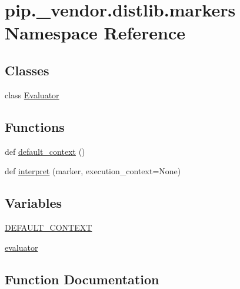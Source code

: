 \hypertarget{namespacepip_1_1__vendor_1_1distlib_1_1markers}{}\section{pip.\+\_\+vendor.\+distlib.\+markers Namespace Reference}
\label{namespacepip_1_1__vendor_1_1distlib_1_1markers}
\subsection*{Classes}
\begin{DoxyCompactItemize}
\item 
class \hyperlink{classpip_1_1__vendor_1_1distlib_1_1markers_1_1Evaluator}{Evaluator}
\end{DoxyCompactItemize}
\subsection*{Functions}
\begin{DoxyCompactItemize}
\item 
def \hyperlink{namespacepip_1_1__vendor_1_1distlib_1_1markers_aff0d15d93b0091980553a9812f6cc44b}{default\+\_\+context} ()
\item 
def \hyperlink{namespacepip_1_1__vendor_1_1distlib_1_1markers_a9799f8442440235d4c12b42de912ce64}{interpret} (marker, execution\+\_\+context=None)
\end{DoxyCompactItemize}
\subsection*{Variables}
\begin{DoxyCompactItemize}
\item 
\hyperlink{namespacepip_1_1__vendor_1_1distlib_1_1markers_a14d5097d8e42b6ce75b87ff57f1212b6}{D\+E\+F\+A\+U\+L\+T\+\_\+\+C\+O\+N\+T\+E\+XT}
\item 
\hyperlink{namespacepip_1_1__vendor_1_1distlib_1_1markers_a729b1e74b054d207cc4c35cdce230990}{evaluator}
\end{DoxyCompactItemize}


\subsection{Function Documentation}
\mbox{\label{namespacepip_1_1__vendor_1_1distlib_1_1markers_aff0d15d93b0091980553a9812f6cc44b}} 
